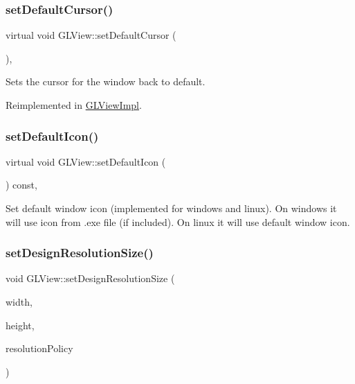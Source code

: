 \subsubsection{\texorpdfstring{set\+Default\+Cursor()}{setDefaultCursor()}}
{\footnotesize\ttfamily virtual void G\+L\+View\+::set\+Default\+Cursor (\begin{DoxyParamCaption}{ }\end{DoxyParamCaption})\hspace{0.3cm}{\ttfamily [inline]}, {\ttfamily [virtual]}}

Sets the cursor for the window back to default. 

Reimplemented in \hyperlink{classGLViewImpl_afdb494137883635527117299e81cd78d}{G\+L\+View\+Impl}.

\mbox{\label{classGLView_a27d3fd61c627780fa1cf2b1357f07d15}} 
\subsubsection{\texorpdfstring{set\+Default\+Icon()}{setDefaultIcon()}}
{\footnotesize\ttfamily virtual void G\+L\+View\+::set\+Default\+Icon (\begin{DoxyParamCaption}{ }\end{DoxyParamCaption}) const\hspace{0.3cm}{\ttfamily [inline]}, {\ttfamily [virtual]}}

Set default window icon (implemented for windows and linux). On windows it will use icon from .exe file (if included). On linux it will use default window icon. \mbox{\label{classGLView_a754e253a506c4eb9a923a2a33b4b955c}} 
\subsubsection{\texorpdfstring{set\+Design\+Resolution\+Size()}{setDesignResolutionSize()}\hspace{0.1cm}{\footnotesize\ttfamily [1/2]}}
{\footnotesize\ttfamily void G\+L\+View\+::set\+Design\+Resolution\+Size (\begin{DoxyParamCaption}\item[{float}]{width,  }\item[{float}]{height,  }\item[{Resolution\+Policy}]{resolution\+Policy }\end{DoxyParamCaption})\hspace{0.3cm}{\ttfamily [virtual]}}


